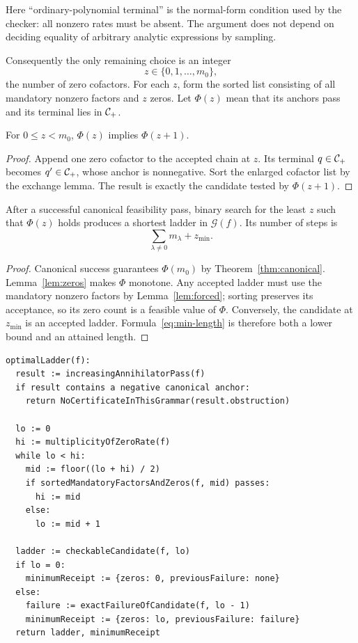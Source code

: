 Here ``ordinary-polynomial terminal'' is the normal-form condition used by the checker: all nonzero rates must be absent. The argument does not depend on deciding equality of arbitrary analytic expressions by sampling.

Consequently the only remaining choice is an integer
\[
 z\in\{0,1,\ldots,m_0\},
\]
the number of zero cofactors. For each $z$, form the sorted list consisting of all mandatory nonzero factors and $z$ zeros. Let $\Phi(z)$ mean that its anchors pass and its terminal lies in $\mathcal C_+$.

\begin{lemma}
\label{lem:zeros}
For $0\le z<m_0$, $\Phi(z)$ implies $\Phi(z+1)$.
\end{lemma}
\begin{proof}
Append one zero cofactor to the accepted chain at $z$. Its terminal $q\in\mathcal C_+$ becomes $q'\in\mathcal C_+$, whose anchor is nonnegative. Sort the enlarged cofactor list by the exchange lemma. The result is exactly the candidate tested by $\Phi(z+1)$.
\end{proof}

\begin{theorem}
\label{thm:optimal}
After a successful canonical feasibility pass, binary search for the least $z$ such that $\Phi(z)$ holds produces a shortest ladder in $\mathcal G(f)$. Its number of steps is
\begin{equation}
 \sum_{\lambda\ne0}m_\lambda+z_{\min}.
 \label{eq:min-length}
\end{equation}
\end{theorem}
\begin{proof}
Canonical success guarantees $\Phi(m_0)$ by Theorem~\ref{thm:canonical}. Lemma~\ref{lem:zeros} makes $\Phi$ monotone. Any accepted ladder must use the mandatory nonzero factors by Lemma~\ref{lem:forced}; sorting preserves its acceptance, so its zero count is a feasible value of $\Phi$. Conversely, the candidate at $z_{\min}$ is an accepted ladder. Formula~\eqref{eq:min-length} is therefore both a lower bound and an attained length.
\end{proof}

\par\noindent\begin{minipage}{\textwidth}
\begin{lstlisting}
optimalLadder(f):
  result := increasingAnnihilatorPass(f)
  if result contains a negative canonical anchor:
    return NoCertificateInThisGrammar(result.obstruction)

  lo := 0
  hi := multiplicityOfZeroRate(f)
  while lo < hi:
    mid := floor((lo + hi) / 2)
    if sortedMandatoryFactorsAndZeros(f, mid) passes:
      hi := mid
    else:
      lo := mid + 1

  ladder := checkableCandidate(f, lo)
  if lo = 0:
    minimumReceipt := {zeros: 0, previousFailure: none}
  else:
    failure := exactFailureOfCandidate(f, lo - 1)
    minimumReceipt := {zeros: lo, previousFailure: failure}
  return ladder, minimumReceipt
\end{lstlisting}
\end{minipage}\par

